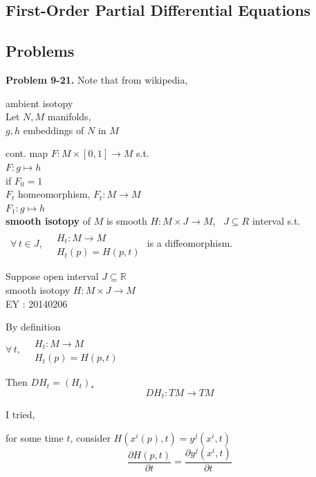 \documentclass[11pt]{amsart}
\theoremstyle{definition}
\newcommand{\problemhead}[1]{\medskip\noindent\textbf{Problem #1.} }
\begin{document}
\subsection*{First-Order Partial Differential Equations }



\subsection*{ Problems }


\problemhead{9-21} Note that from wikipedia,

ambient isotopy \\
Let $N, M$ manifolds, \\
\quad $g,h$ embeddings of $N$ in $M$

cont. map $F: M \times [0,1] \to M$ s.t.  \\
$F: g\mapsto h$ \\
if $F_0 = 1$ \\
\phantom{ if } $F_t$ homeomorphism, $F_t: M \to M$ \\
\phantom{ if } $F_1 : g \mapsto h$ \\

\textbf{smooth isotopy} of $M$ is smooth $H: M \times J \to M$, \, $J \subseteq R$ interval s.t. \\
\quad \, $\forall \, t \in J$, $\begin{aligned} & \quad \\
  & H_t : M \to M \\
  & H_t(p) = H(p,t) \end{aligned}$ is a diffeomorphism.

Suppose open interval $J \subseteq \mathbb{R}$ \\
\phantom{Suppose } smooth isotopy $H:M \times J \to M$ \\

EY : 20140206

By definition \\
$\forall \, t, \, \begin{aligned} & \quad \\
  & H_t : M \to M \\
  & H_t(p) = H(p,t) \end{aligned}$

Then $DH_t = (H_t)_*$ \\
\[
DH_t : TM \to TM
\]

I tried,

for some time $t$, consider $H(x^i(p),t) = y^j(x^i,t)$
\[
\frac{ \partial H(p,t)}{ \partial t } = \frac{ \partial y^j(x^i,t) }{ \partial t }
\]
\end{document}

